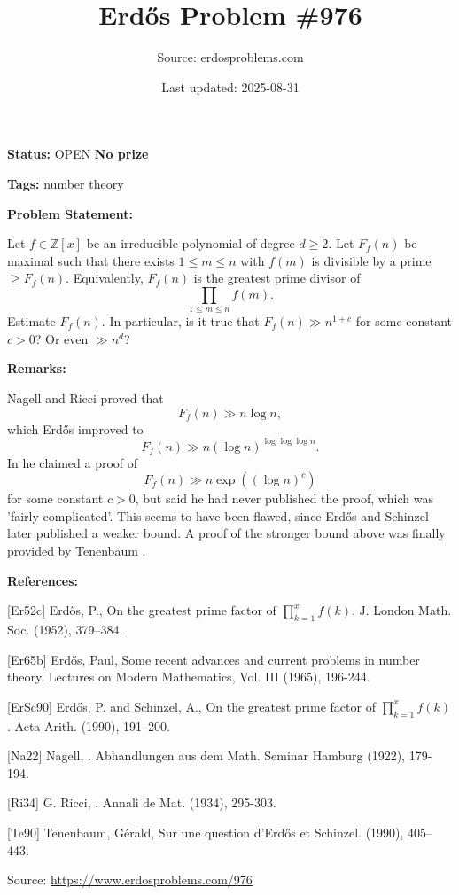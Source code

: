 \documentclass{article}
\title{Erd\H{o}s Problem \#976}
\date{Last updated: 2025-08-31}
\author{Source: erdosproblems.com}
\begin{document}
\maketitle

\noindent\textbf{Status:} OPEN \quad \textbf{No prize}

\noindent\textbf{Tags:} number theory

\medskip
\noindent\textbf{Problem Statement:}

Let $f\in \mathbb{Z}[x]$ be an irreducible polynomial of degree $d\geq 2$. Let $F_f(n)$ be maximal such that there exists $1\leq m\leq n$ with $f(m)$ is divisible by a prime $\geq F_f(n)$. Equivalently, $F_f(n)$ is the greatest prime divisor of\[\prod_{1\leq m\leq n}f(m).\]Estimate $F_f(n)$. In particular, is it true that $F_f(n)\gg n^{1+c}$ for some constant $c>0$? Or even $\gg n^d$?

\bigskip
\noindent\textbf{Remarks:}

Nagell \cite{Na22} and Ricci \cite{Ri34} proved that\[F_f(n) \gg n\log n,\]which Erd\H{o}s \cite{Er52c} improved to\[F_f(n) \gg n(\log n)^{\log\log\log n}.\]In \cite{Er65b} he claimed a proof of\[F_f(n) \gg n\exp((\log n)^c)\]for some constant $c>0$, but said he had never published the proof, which was 'fairly complicated'. This seems to have been flawed, since Erd\H{o}s and Schinzel \cite{ErSc90} later published a weaker bound. A proof of the stronger bound above was finally provided by Tenenbaum \cite{Te90}.

\bigskip
\noindent\textbf{References:}

[Er52c] Erd\H{o}s, P., On the greatest prime factor of {$\prod^x_{k=1}f(k)$}. J. London Math. Soc. (1952), 379--384.
 
 [Er65b] Erd\H{o}s, Paul, Some recent advances and current problems in number theory. Lectures on Modern Mathematics, Vol. III (1965), 196-244.
 
 [ErSc90] Erd\H{o}s, P. and Schinzel, A., On the greatest prime factor of {$\prod^x_{k=1}f(k)$}. Acta Arith. (1990), 191--200.
 
 [Na22] Nagell, . Abhandlungen aus dem Math. Seminar Hamburg (1922), 179-194.
 
 [Ri34] G. Ricci, . Annali de Mat. (1934), 295-303.
 
 [Te90] Tenenbaum, G\'{e}rald, Sur une question d'{E}rd\H{o}s et Schinzel. (1990), 405--443.

\bigskip
\noindent\small{Source: \url{https://www.erdosproblems.com/976}}
\end{document}
